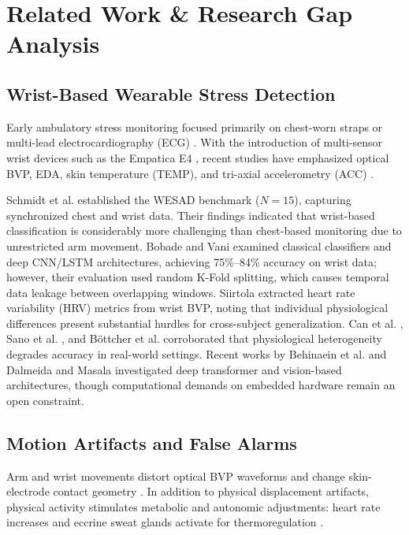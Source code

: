 \documentclass[conference]{IEEEtran}
\begin{document}
\section{Related Work \& Research Gap Analysis}

\subsection{Wrist-Based Wearable Stress Detection}
Early ambulatory stress monitoring focused primarily on chest-worn straps or multi-lead electrocardiography (ECG) \cite{taskforce1996heart}. With the introduction of multi-sensor wrist devices such as the Empatica E4 \cite{garbarino2014empatica}, recent studies have emphasized optical BVP, EDA, skin temperature (TEMP), and tri-axial accelerometry (ACC) \cite{can2019stress, gjoreski2016continuous}.

Schmidt et al. \cite{schmidt2018wesad} established the WESAD benchmark ($N=15$), capturing synchronized chest and wrist data. Their findings indicated that wrist-based classification is considerably more challenging than chest-based monitoring due to unrestricted arm movement. Bobade and Vani \cite{bobade2020stress} examined classical classifiers and deep CNN/LSTM architectures, achieving 75\%--84\% accuracy on wrist data; however, their evaluation used random K-Fold splitting, which causes temporal data leakage between overlapping windows. Siirtola \cite{siirtola2019continuous} extracted heart rate variability (HRV) metrics from wrist BVP, noting that individual physiological differences present substantial hurdles for cross-subject generalization. Can et al. \cite{can2019stress}, Sano et al. \cite{sano2018multimodal}, and Böttcher et al. \cite{bottcher2023detection} corroborated that physiological heterogeneity degrades accuracy in real-world settings. Recent works by Behinaein et al. \cite{behinaein2022transformer} and Dalmeida and Masala \cite{dalmeida2021computer} investigated deep transformer and vision-based architectures, though computational demands on embedded hardware remain an open constraint.

\subsection{Motion Artifacts and False Alarms}
Arm and wrist movements distort optical BVP waveforms and change skin-electrode contact geometry \cite{tamura2014wearable, zhang2014troika, schumm2010effect}. In addition to physical displacement artifacts, physical activity stimulates metabolic and autonomic adjustments: heart rate increases and eccrine sweat glands activate for thermoregulation \cite{boucsein2012electrodermal, schumm2010effect}.
\end{document}
